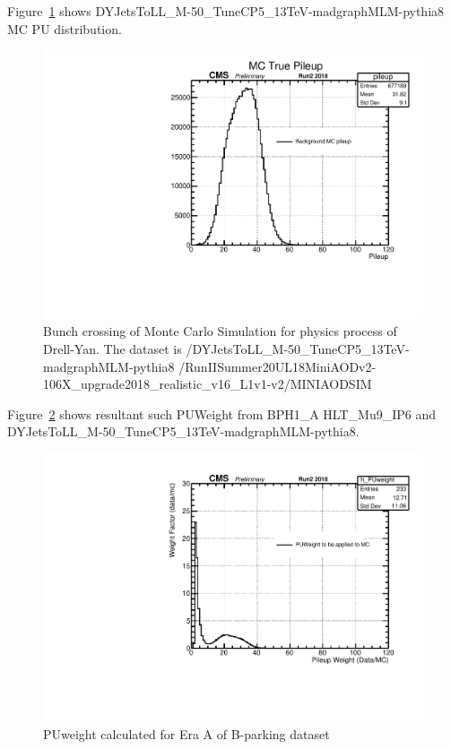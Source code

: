 Figure~\ref{fig:MCPU} shows DYJetsToLL\_M-50\_TuneCP5\_13TeV-madgraphMLM-pythia8 MC PU distribution.
\begin{figure}[h!]
	\caption{Bunch crossing of Monte Carlo Simulation for physics process of Drell-Yan. The dataset is /DYJetsToLL\_M-50\_TuneCP5\_13TeV-madgraphMLM-pythia8
\newline/RunIISummer20UL18MiniAODv2-106X\_upgrade2018\_realistic\_v16\_L1v1-v2/\newline MINIAODSIM}
  \label{fig:MCPU}
  \centering
  \includegraphics[width=0.67\linewidth]{figs/NVtx_DYJetsToLL_M-50_try.pdf}

\end{figure}

Figure~\ref{fig:PUWeight9} shows resultant such PUWeight from BPH1\_A HLT\_Mu9\_IP6 and DYJetsToLL\_M-50\_TuneCP5\_13TeV-madgraphMLM-pythia8.
\begin{figure}[h!]
  \caption{PUweight calculated for Era A of B-parking dataset}
  \label{fig:PUWeight9}
  \centering
  \includegraphics[width=0.67\linewidth]{figs/NVtx_PUWeight.pdf}

\end{figure}
